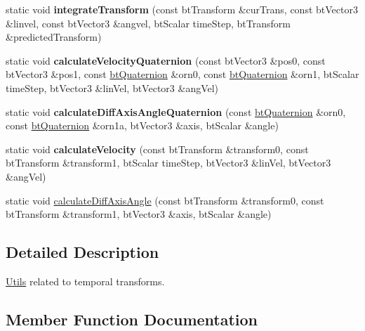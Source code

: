 \begin{DoxyCompactItemize}
\item 
\mbox{\label{classbtTransformUtil_ac943ee956ab17687013a60a5918b23e4}} 
static void {\bfseries integrate\+Transform} (const bt\+Transform \&cur\+Trans, const bt\+Vector3 \&linvel, const bt\+Vector3 \&angvel, bt\+Scalar time\+Step, bt\+Transform \&predicted\+Transform)
\item 
\mbox{\label{classbtTransformUtil_a291f6db1cc528595ad710ab8f256b98a}} 
static void {\bfseries calculate\+Velocity\+Quaternion} (const bt\+Vector3 \&pos0, const bt\+Vector3 \&pos1, const \hyperlink{classbtQuaternion}{bt\+Quaternion} \&orn0, const \hyperlink{classbtQuaternion}{bt\+Quaternion} \&orn1, bt\+Scalar time\+Step, bt\+Vector3 \&lin\+Vel, bt\+Vector3 \&ang\+Vel)
\item 
\mbox{\label{classbtTransformUtil_a11daea5e8931d47ceaf56aee74dadf96}} 
static void {\bfseries calculate\+Diff\+Axis\+Angle\+Quaternion} (const \hyperlink{classbtQuaternion}{bt\+Quaternion} \&orn0, const \hyperlink{classbtQuaternion}{bt\+Quaternion} \&orn1a, bt\+Vector3 \&axis, bt\+Scalar \&angle)
\item 
\mbox{\label{classbtTransformUtil_adea3509ccb6eb65675a102c80aa1b312}} 
static void {\bfseries calculate\+Velocity} (const bt\+Transform \&transform0, const bt\+Transform \&transform1, bt\+Scalar time\+Step, bt\+Vector3 \&lin\+Vel, bt\+Vector3 \&ang\+Vel)
\item 
static void \hyperlink{classbtTransformUtil_a39f53b05940a57082053067bd5e337ec}{calculate\+Diff\+Axis\+Angle} (const bt\+Transform \&transform0, const bt\+Transform \&transform1, bt\+Vector3 \&axis, bt\+Scalar \&angle)
\end{DoxyCompactItemize}


\subsection{Detailed Description}
\hyperlink{classUtils}{Utils} related to temporal transforms. 

\subsection{Member Function Documentation}
\mbox{\label{classbtTransformUtil_a39f53b05940a57082053067bd5e337ec}} 
